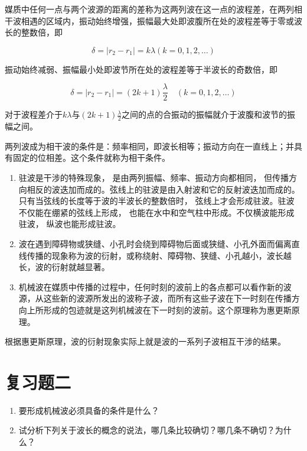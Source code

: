 媒质中任何一点与两个波源的距离的差称为这两列波在这一点的波程差，在两列相干波相遇的区域内，振动始终增强，振幅最大处即波腹所在处的波程差等于零或波长的整数倍，即

\[
\delta = \left| r _ {2} - r _ {1} \right| = k \lambda (k = 0, 1, 2, \dots)
\]

振动始终减弱、振幅最小处即波节所在处的波程差等于半波长的奇数倍，即

\[
\delta=\left|r_2-r_1\right|=(2k+1)\frac{\lambda}{2}\quad(k=0,1,2,\dots)
\]

对于波程差介于\(k\lambda\)与\((2k + 1)\frac{\lambda}{2}\)之间的点的合振动的振幅就介于波腹和波节的振幅之间。

两列波成为相干波的条件是：频率相同，即波长相等；振动方向在一直线上；并具有固定的位相差。这个条件就称为相干条件。

\begin{enumerate}
\def\labelenumi{\arabic{enumi}.}
\setcounter{enumi}{8}
\item
  驻波是干涉的特殊现象， 是由两列振幅、频率、振动方向都相同，
  但传播方向相反的波迭加而成的。弦线上的驻波是由入射波和它的反射波迭加而成的。只有当弦线的长度等于波的半波长的整数倍时，
  弦线上才会形成驻波。驻波不仅能在绷紧的弦线上形成，
  也能在水中和空气柱中形成。不仅横波能形成驻波， 纵波也能形成驻波。
\item
  波在遇到障碍物或狭缝、小孔时会绕到障碍物后面或狭缝、小孔外面而偏离直线传播的现象称为波的衍射，或称绕射、障碍物、狭缝、小孔越小，波长越长，波的衍射就越显著。
\item
  机械波在媒质中传播的过程中，任何时刻的波前上的各点都可以看作新的波源，从这些新的波源所发出的波称子波，而所有这些子波在下一时刻在传播方向上所形成的包迹就是这列机械波在下一时刻的波前。这个原理称为惠更斯原理。
\end{enumerate}

根据惠更斯原理，波的衍射现象实际上就是波的一系列子波相互干涉的结果。

\section{复习题二}\label{ux590dux4e60ux9898ux4e8c}

\begin{enumerate}
\def\labelenumi{\arabic{enumi}.}
\item
  要形成机械波必须具备的条件是什么？
\item
  试分析下列关于波长的概念的说法，哪几条比较确切？哪几条不确切？为什么？
\end{enumerate}

